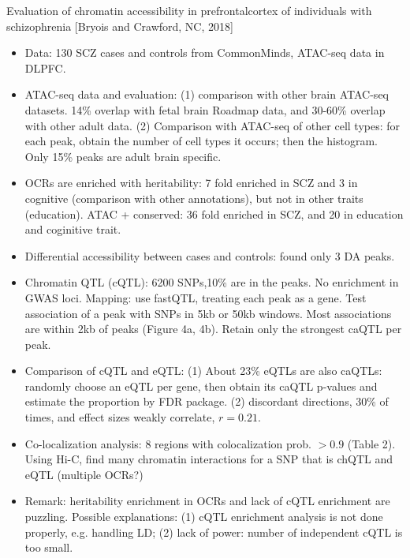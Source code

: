 \documentclass{report}
\begin{document}
Evaluation of chromatin accessibility in prefrontalcortex of individuals with schizophrenia [Bryois and Crawford, NC, 2018]
\begin{itemize}
	
	\item Data: 130 SCZ cases and controls from CommonMinds, ATAC-seq data in DLPFC. 
	
	\item ATAC-seq data and evaluation: (1) comparison with other brain ATAC-seq datasets. 14\% overlap with fetal brain Roadmap data, and 30-60\% overlap with other adult data. (2) Comparison with ATAC-seq of other cell types: for each peak, obtain the number of cell types it occurs; then the histogram. Only 15\% peaks are adult brain specific. 
	
	\item OCRs are enriched with heritability: 7 fold enriched in SCZ and 3 in cognitive (comparison with other annotations), but not in other traits (education). ATAC + conserved: 36 fold enriched in SCZ, and 20 in education and coginitive trait. 
	
	\item Differential accessibility between cases and controls: found only 3 DA peaks. 
	
	\item Chromatin QTL (cQTL): 6200 SNPs,10\% are in the peaks. No enrichment in GWAS loci. Mapping: use fastQTL, treating each peak as a gene. Test association of a peak with SNPs in 5kb or 50kb windows. Most associations are within 2kb of peaks (Figure 4a, 4b). Retain only the strongest caQTL per peak. 
	
	\item Comparison of cQTL and eQTL: (1) About 23\% eQTLs are also caQTLs: randomly choose an eQTL per gene, then obtain its caQTL p-values and estimate the proportion by FDR package. (2) discordant directions, 30\% of times, and effect sizes weakly correlate, $r = 0.21$. 
	
	\item Co-localization analysis: 8 regions with colocalization prob. $>0.9$ (Table 2). Using Hi-C, find many chromatin interactions for a SNP that is chQTL and eQTL (multiple OCRs?)
	
	\item Remark: heritability enrichment in OCRs and lack of cQTL enrichment are puzzling. Possible explanations: (1) cQTL enrichment analysis is not done properly, e.g. handling LD; (2) lack of power: number of independent cQTL is too small. 
\end{itemize}
\end{document}
